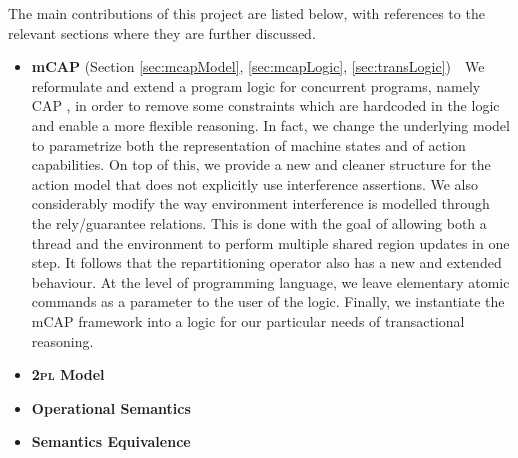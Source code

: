 The main contributions of this project are listed below, with references to the relevant sections where they are further discussed.
\begin{itemize}
	\item \textbf{mCAP} (Section \ref{sec:mcapModel}, \ref{sec:mcapLogic}, \ref{sec:transLogic})\ \ We reformulate and extend a program logic for concurrent programs, namely CAP \cite{cap}, in order to remove some constraints which are hardcoded in the logic and enable a more flexible reasoning. In fact, we change the underlying model to parametrize both the representation of machine states and of action capabilities. On top of this, we provide a new and cleaner structure for the action model that does not explicitly use interference assertions. We also considerably modify the way environment interference is modelled through the rely/guarantee relations. This is done with the goal of allowing both a thread and the environment to perform multiple shared region updates in one step. It follows that the repartitioning operator also has a new and extended behaviour. At the level of programming language, we leave elementary atomic commands as a parameter to the user of the logic. Finally, we instantiate the mCAP framework into a logic for our particular needs of transactional reasoning.
	
	\item \textbf{\textsc{2pl} Model}\ \ 
	
	\item \textbf{Operational Semantics}\ \
	
	\item \textbf{Semantics Equivalence}
\end{itemize}